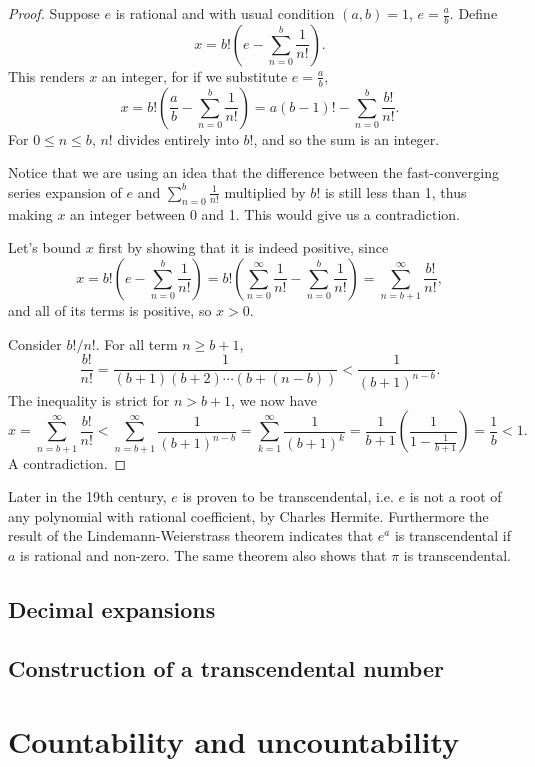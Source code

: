 \documentclass[main.tex]{subfiles}
\begin{document}
		\begin{proof}
			Suppose $e$ is rational and with usual condition $(a,b) = 1$, $e = \frac{a}{b}$. Define
			\begin{equation}
				x = b!\left(e - \sum_{n = 0}^{b} \frac{1}{n!}\right).
			\end{equation}
			This renders $x$ an integer, for if we substitute $e = \frac{a}{b}$,
			\begin{equation*}
				x = b!\left(\frac{a}{b} - \sum_{n = 0}^{b} \frac{1}{n!}\right) = a(b - 1)! - \sum_{n = 0}^{b} \frac{b!}{n!}.
			\end{equation*}
			For $0 \leq n \leq b$, $n!$ divides entirely into $b!$, and so the sum is an integer.
			
			Notice that we are using an idea that the difference between the fast-converging series expansion of $e$ and $\sum_{n = 0}^{b} \frac{1}{n!}$ multiplied by $b!$ is still less than 1, thus making $x$ an integer between 0 and 1. This would give us a contradiction.
			
			Let's bound $x$ first by showing that it is indeed positive, since
			\begin{equation}
			x = b!\left(e - \sum_{n = 0}^{b} \frac{1}{n!}\right) = b!\left(\sum_{n = 0}^{\infty} \frac{1}{n!} - \sum_{n = 0}^{b} \frac{1}{n!}\right) = \sum_{n = b + 1}^{\infty} \frac{b!}{n!},
			\end{equation}
			and all of its terms is positive, so $x > 0$.
			
			Consider ${b!}/{n!}$. For all term $n \geq b + 1$,
			\begin{equation*}
				\frac{b!}{n!} = \frac{1}{(b + 1)(b + 2)\cdots(b + (n - b))} < \frac{1}{(b + 1)^{n - b}}.
			\end{equation*}
			The inequality is strict for $n > b + 1$, we now have
			\begin{equation}
				x = \sum_{n = b + 1}^{\infty} \frac{b!}{n!} < \sum_{n = b + 1}^{\infty} \frac{1}{(b + 1)^{n - b}} = \sum_{k = 1}^{\infty} \frac{1}{(b + 1)^{k}} = \frac{1}{b + 1}\left(\frac{1}{1 - \frac{1}{b + 1}}\right) = \frac{1}{b} < 1.
			\end{equation}
			A contradiction.
		\end{proof}
		Later in the 19th century, $e$ is proven to be transcendental, i.e. $e$ is not a root of any polynomial with rational coefficient, by Charles Hermite. Furthermore the result of the Lindemann-Weierstrass theorem indicates that $e^a$ is transcendental if $a$ is rational and non-zero. The same theorem also shows that $\pi$ is transcendental.
		
		\subsection{Decimal expansions}
			
		\subsection{Construction of a transcendental number}
		
	\section{Countability and uncountability}
		
	
\end{document}
